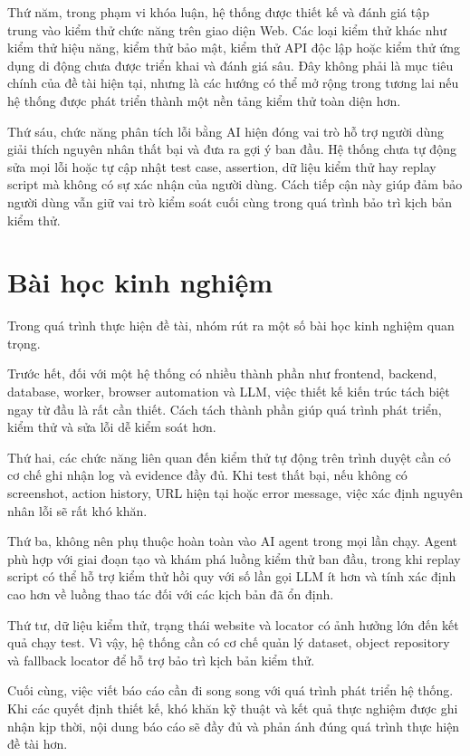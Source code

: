 Thứ năm, trong phạm vi khóa luận, hệ thống được thiết kế và đánh giá tập trung vào kiểm thử chức năng trên giao diện Web. Các loại kiểm thử khác như kiểm thử hiệu năng, kiểm thử bảo mật, kiểm thử API độc lập hoặc kiểm thử ứng dụng di động chưa được triển khai và đánh giá sâu. Đây không phải là mục tiêu chính của đề tài hiện tại, nhưng là các hướng có thể mở rộng trong tương lai nếu hệ thống được phát triển thành một nền tảng kiểm thử toàn diện hơn.

Thứ sáu, chức năng phân tích lỗi bằng AI hiện đóng vai trò hỗ trợ người dùng giải thích nguyên nhân thất bại và đưa ra gợi ý ban đầu. Hệ thống chưa tự động sửa mọi lỗi hoặc tự cập nhật test case, assertion, dữ liệu kiểm thử hay replay script mà không có sự xác nhận của người dùng. Cách tiếp cận này giúp đảm bảo người dùng vẫn giữ vai trò kiểm soát cuối cùng trong quá trình bảo trì kịch bản kiểm thử.

\section{Bài học kinh nghiệm}

Trong quá trình thực hiện đề tài, nhóm rút ra một số bài học kinh nghiệm quan trọng.

Trước hết, đối với một hệ thống có nhiều thành phần như frontend, backend, database, worker, browser automation và LLM, việc thiết kế kiến trúc tách biệt ngay từ đầu là rất cần thiết. Cách tách thành phần giúp quá trình phát triển, kiểm thử và sửa lỗi dễ kiểm soát hơn.

Thứ hai, các chức năng liên quan đến kiểm thử tự động trên trình duyệt cần có cơ chế ghi nhận log và evidence đầy đủ. Khi test thất bại, nếu không có screenshot, action history, URL hiện tại hoặc error message, việc xác định nguyên nhân lỗi sẽ rất khó khăn.

Thứ ba, không nên phụ thuộc hoàn toàn vào AI agent trong mọi lần chạy. Agent phù hợp với giai đoạn tạo và khám phá luồng kiểm thử ban đầu, trong khi replay script có thể hỗ trợ kiểm thử hồi quy với số lần gọi LLM ít hơn và tính xác định cao hơn về luồng thao tác đối với các kịch bản đã ổn định.

Thứ tư, dữ liệu kiểm thử, trạng thái website và locator có ảnh hưởng lớn đến kết quả chạy test. Vì vậy, hệ thống cần có cơ chế quản lý dataset, object repository và fallback locator để hỗ trợ bảo trì kịch bản kiểm thử.

Cuối cùng, việc viết báo cáo cần đi song song với quá trình phát triển hệ thống. Khi các quyết định thiết kế, khó khăn kỹ thuật và kết quả thực nghiệm được ghi nhận kịp thời, nội dung báo cáo sẽ đầy đủ và phản ánh đúng quá trình thực hiện đề tài hơn.

